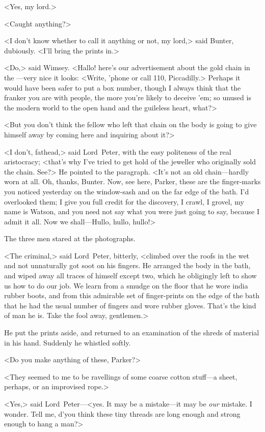 <Yes, my lord.>

<Caught anything?>

<I don't know whether to call it anything or not, my lord,> said Bunter, dubiously. <I'll bring the prints in.>

<Do,> said Wimsey. <Hallo! here's our advertisement about the gold chain in the —very nice it looks: <Write, 'phone or call 110, Piccadilly.> Perhaps it would have been safer to put a box number, though I always think that the franker you are with people, the more you're likely to deceive 'em; so unused is the modern world to the open hand and the guileless heart, what?>

<But you don't think the fellow who left that chain on the body is going to give himself away by coming here and inquiring about it?>

<I don't, fathead,> said Lord~Peter, with the easy politeness of the real aristocracy; <that's why I've tried to get hold of the jeweller who originally sold the chain. See?> He pointed to the paragraph. <It's not an old chain—hardly worn at all. Oh, thanks, Bunter. Now, see here, Parker, these are the finger-marks you noticed yesterday on the window-sash and on the far edge of the bath. I'd overlooked them; I give you full credit for the discovery, I crawl, I grovel, my name is Watson, and you need not say what you were just going to say, because I admit it all. Now we shall—Hullo, hullo, hullo!>

The three men stared at the photographs.

<The criminal,> said Lord~Peter, bitterly, <climbed over the roofs in the wet and not unnaturally got soot on his fingers. He arranged the body in the bath, and wiped away all traces of himself except two, which he obligingly left to show us how to do our job. We learn from a smudge on the floor that he wore india rubber boots, and from this admirable set of finger-prints on the edge of the bath that he had the usual number of fingers and wore rubber gloves. That's the kind of man he is. Take the fool away, gentlemen.>

He put the prints aside, and returned to an examination of the shreds of material in his hand. Suddenly he whistled softly.

<Do you make anything of these, Parker?>

<They seemed to me to be ravellings of some coarse cotton stuff—a sheet, perhaps, or an improvised rope.>

<Yes,> said Lord~Peter—<yes. It may be a mistake—it may be \textit{our} mistake. I wonder. Tell me, d'you think these tiny threads are long enough and strong enough to hang a man?>

